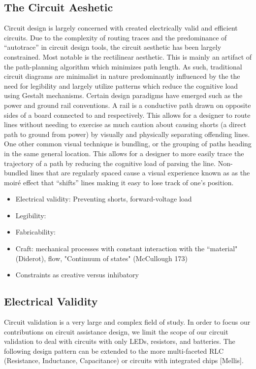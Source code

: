 \documentclass{sigchi}
\newcommand*{\nt}[1]{{\textbf{\small{\fontfamily{cmss}\selectfont{#1}}}}}
\begin{document}
    \subsection{The Circuit Aeshetic} Circuit design is largely concerned with created electrically valid and efficient circuits.  Due to the complexity of routing traces and the predominance of ``autotrace'' in circuit design tools, the circuit aesthetic has been largely constrained. Most notable is the rectilinear aesthetic. This is mainly an artifact of the path-planning algorithm which minimizes path length. As such, traditional circuit diagrams are minimalist in nature predominantly influenced by the the need for legibility and largely utilize patterns which reduce the cognitive load using Gestalt mechanisms. Certain design paradigms have emerged such as the power and ground rail conventions. A rail is a conductive path drawn on opposite sides of a board connected to \nt{V+} and \nt{GND} respectively. This allows for a designer to route lines without needing to exercise as much caution about causing shorts (a direct path to ground from power) by visually and physically separating offending lines. One other common visual technique is bundling, or the grouping of paths heading in the same general location. This allows for a designer to more easily trace the trajectory of a path by reducing the cognitive load of parsing the line. Non-bundled lines that are regularly spaced cause a visual experience known as as the moir\'e effect that ``shifts'' lines making it easy to lose track of one's position.
    
    
            
    \begin{itemize}
        \item Electrical validity: Preventing shorts, forward-voltage load
        \item Legibility: 
        \item Fabricability:
    \end{itemize}
    
    \begin{itemize}
        \item Craft: mechanical processes with constant interaction with the ``material" (Diderot), flow, "Continuum of states" (McCullough 173)
        \item Constraints as creative versus inhibatory
    \end{itemize}
    \subsection{Electrical Validity}
     Circuit validation is a very large and complex field of study. In order to focus our contributions on circuit assistance design, we limit the scope of our circuit validation to deal with circuits with only LEDs, resistors, and batteries. The following design pattern can be extended to the more multi-faceted RLC (Resistance, Inductance, Capacitance) or circuits with integrated chips [Mellis]. 
     
\end{document}
